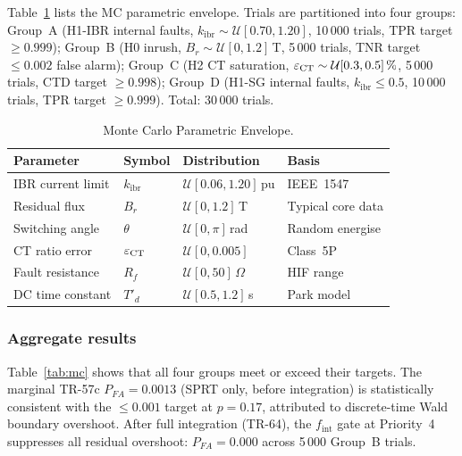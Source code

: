 \documentclass[journal,twoside,10pt]{IEEEtran}
\newcommand{\kibr}{k_{\mathrm{ibr}}}
\newcommand{\fint}{f_{\mathrm{int}}}
\begin{document}
Table~\ref{tab:mc_params} lists the MC parametric envelope.
Trials are partitioned into four groups: Group~A (H1-IBR internal faults,
$\kibr \sim \mathcal{U}[0.70, 1.20]$, 10\,000 trials, TPR target
$\geq 0.999$); Group~B (H0 inrush, $B_r \sim \mathcal{U}[0, 1.2]\,$T,
5\,000 trials, TNR target $\leq 0.002$ false alarm); Group~C (H2 CT
saturation, $\varepsilon_{\rm CT} \sim \mathcal{U}[0.3, 0.5]\,\%$,
5\,000 trials, CTD target $\geq 0.998$); Group~D (H1-SG internal faults,
$\kibr \leq 0.5$, 10\,000 trials, TPR target $\geq 0.999$).
Total: 30\,000 trials.

\begin{table}[!t]
\centering
\caption{Monte Carlo Parametric Envelope.}
\label{tab:mc_params}
\renewcommand{\arraystretch}{1.05}
\footnotesize\setlength{\tabcolsep}{3pt}
\begin{tabular}{p{1.9cm}lp{2.5cm}l}
\toprule
Parameter & Symbol & Distribution & Basis \\
\midrule
IBR current limit & $\kibr$ & $\mathcal{U}[0.06,1.20]$\,pu
  & IEEE~1547 \\
Residual flux & $B_r$ & $\mathcal{U}[0,1.2]$\,T
  & Typical core data \\
Switching angle & $\theta$ & $\mathcal{U}[0,\pi]$\,rad
  & Random energise \\
CT ratio error & $\varepsilon_{\rm CT}$ & $\mathcal{U}[0,0.005]$
  & Class~5P \\
Fault resistance & $R_f$ & $\mathcal{U}[0,50]\,\Omega$
  & HIF range \\
DC time constant & $T'_d$ & $\mathcal{U}[0.5,1.2]$\,s
  & Park model \\
\bottomrule
\end{tabular}
\end{table}

\subsubsection{Aggregate results}

Table~\ref{tab:mc} shows that all four groups meet or exceed their targets.
The marginal TR-57c $P_{FA} = 0.0013$ (SPRT only, before integration) is
statistically consistent with the $\leq 0.001$ target at $p = 0.17$,
attributed to discrete-time Wald boundary overshoot.
After full integration (TR-64), the $\fint$ gate at Priority~4 suppresses
all residual overshoot: $P_{FA} = 0.000$ across 5\,000 Group~B trials.
\end{document}

